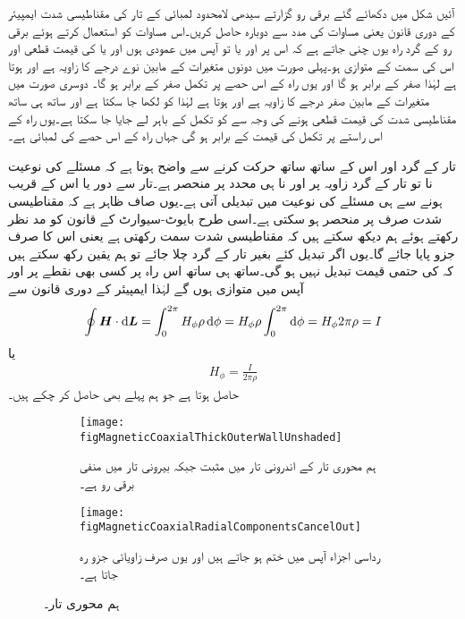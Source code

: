 آئیں شکل  میں دکھائے گئے  برقی رو گزارتے سیدھی لامحدود لمبائی کے تار کی مقناطیسی شدت ایمپیئر کے دوری قانون یعنی مساوات  کی مدد سے دوبارہ حاصل کریں۔اس مساوات کو استعمال کرتے ہوئے  برقی رو کے گرد راہ یوں چنی جاتے ہے کہ اس پر  اور  یا تو آپس میں عمودی ہوں اور یا  کی قیمت قطعی اور اس کی سمت  کے متوازی ہو۔پہلی صورت میں دونوں متغیرات کے مابین نوے درجے کا زاویہ  ہے اور  ہوتا ہے لہٰذا  صفر کے برابر ہو گا اور یوں راہ کے اس حصے پر تکمل صفر کے برابر ہو گا۔ دوسری صورت میں متغیرات کے مابین صفر درجے کا زاویہ ہے اور  ہوتا ہے لہٰذا   کو  لکھا جا سکتا ہے اور ساتھ ہی ساتھ مقناطیسی شدت کی قیمت قطعی ہونے کی وجہ سے  کو تکمل کے باہر لے جایا جا سکتا ہے۔یوں راہ کے اس راستے پر تکمل کی قیمت  کے برابر ہو گی جہاں  راہ کے اس حصے کی لمبائی ہے۔

تار کے گرد اور اس کے ساتھ ساتھ حرکت کرنے سے واضح ہوتا ہے کہ مسئلے کی نوعیت نا تو تار کے گرد زاویہ  پر اور نا ہی محدد  پر منحصر ہے۔تار سے دور یا اس کے قریب ہونے سے ہی مسئلے کی نوعیت میں تبدیلی آتی ہے۔یوں صاف ظاہر ہے کہ مقناطیسی شدت صرف  پر منحصر ہو سکتی ہے۔اسی طرح بایوٹ-سیوارٹ کے قانون کو مد نظر رکھتے ہوئے ہم دیکھ سکتے ہیں کہ مقناطیسی شدت  سمت رکھتی ہے یعنی اس کا صرف  جزو پایا جائے گا۔یوں اگر  تبدیل کئے بغیر تار کے گرد چلا جائے تو ہم یقین رکھ سکتے ہیں کہ  کی حتمی قیمت  تبدیل نہیں ہو گی۔ساتھ ہی ساتھ اس راہ پر کسی بھی نقطے پر   اور  آپس میں متوازی ہوں گے لہٰذا ایمپیئر کے دوری قانون سے
\begin{align*}
\oint \kvec{H} \cdot \dif \kvec{L}=\int_0^{2\pi} H_{\phi} \rho \dif \phi=H_{\phi} \rho \int_0^{2\pi} \dif \phi=H_{\phi} 2\pi \rho=I
\end{align*}
یا
\begin{align*}
H_{\phi}=\frac{I}{2\pi \rho}
\end{align*}
حاصل ہوتا ہے جو ہم پہلے بھی حاصل کر چکے ہیں۔
\begin{figure}
\centering
\begin{subfigure}{0.5\textwidth}
\centering
\texttt{[image: figMagneticCoaxialThickOuterWallUnshaded]}
\caption{ہم محوری تار کے اندرونی تار میں مثبت جبکہ بیرونی تار میں منفی برقی رو ہے۔}
\label{شکل_مقناطیسی_ہم_محوری_تار_مثبت_منفی_رو}
\end{subfigure}%
\begin{subfigure}{0.5\textwidth}
\centering
\texttt{[image: figMagneticCoaxialRadialComponentsCancelOut]}
\caption{رداسی اجزاء آپس میں ختم ہو جاتے ہیں اور یوں صرف زاویائی جزو رہ جاتا ہے۔}
\label{شکل_مقناطیسی_ہم_محوری_صرف_زاویائی_جزو}
\end{subfigure}%
\caption{ہم محوری تار۔}
\label{شکل_مقناطیسی_ہم_محوری_تار}
\end{figure}

